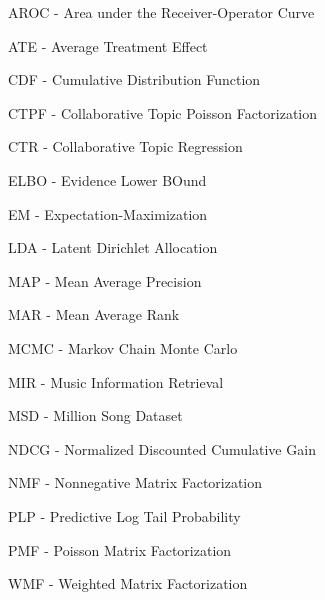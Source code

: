 AROC - Area under the Receiver-Operator Curve

ATE - Average Treatment Effect

CDF - Cumulative Distribution Function

CTPF - Collaborative Topic Poisson Factorization

CTR - Collaborative Topic Regression

ELBO - Evidence Lower BOund

EM - Expectation-Maximization

LDA - Latent Dirichlet Allocation

MAP - Mean Average Precision

MAR - Mean Average Rank

MCMC - Markov Chain Monte Carlo

MIR - Music Information Retrieval

MSD - Million Song Dataset

NDCG - Normalized Discounted Cumulative Gain

NMF - Nonnegative Matrix Factorization

PLP - Predictive Log Tail Probability

PMF - Poisson Matrix Factorization

WMF - Weighted Matrix Factorization

